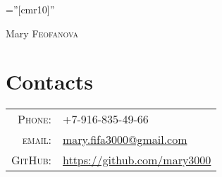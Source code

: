 \documentclass[a4paper,12pt]{article}
\begin{document}

\pagestyle{empty} %

\font\fb=''[cmr10]'' %

\par{\centering
		{\Huge Mary \textsc{Feofanova}
	}\bigskip\par}

\section{Contacts}

\begin{tabular}{rl}
    \textsc{Phone:}     & +7-916-835-49-66\\
    \textsc{email:}     & \href{mailto:mary.fifa3000@gmail.com}{mary.fifa3000@gmail.com}\\
    \textsc{GitHub:}    &
    \url{https://github.com/mary3000}
\end{tabular}

\end{document}
